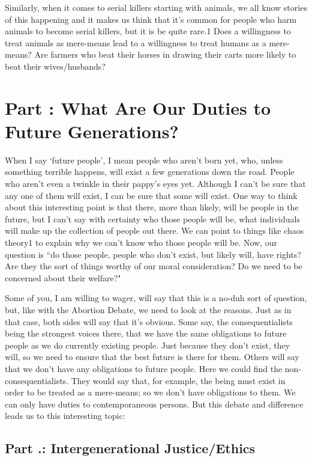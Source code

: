 Similarly, when it comes to serial killers starting with animals, we all know stories of this happening and it makes us think that it's common for people who harm animals to become serial killers, but it is be quite rare.1 Does a willingness to treat animals as mere-means lead to a willingness to treat humans as a mere-means? Are farmers who beat their horses in drawing their carts more likely to beat their wives/husbands?
\chapter{Part \thechapcount: What Are Our Duties to Future Generations?}\setcounter{seccount}{1}
When I say ‘future people’, I mean people who aren’t born yet, who, unless something terrible happens, will exist a few generations down the road. People who aren’t even a twinkle in their pappy’s eyes yet. Although I can’t be sure that any one of them will exist, I can be sure that some will exist. One way to think about this interesting point is that there, more than  likely, will be people in the future, but I can't say with certainty who those people will be, what individuals will make up the collection of people out there. We can point to things like chaos theory1 to explain why we can't know who those people will be.  Now, our question is ``do those people, people who don't exist, but likely will, have rights? Are they the sort of things worthy of our moral consideration? Do we need to be concerned about their welfare?"

Some of you, I am willing to wager, will say that this is a no-duh sort of question, but, like with the Abortion Debate, we need to look at the reasons. Just as in that case, both sides will say that it's obvious. Some say, the consequentialists being the strongest voices there, that we have the same obligations to future people as we do currently existing people. Just because they don't exist, they will, so we need to ensure that the best future is there for them. Others will say that we don't have any obligations to future people. Here we could find the non-consequentialists. They would say that, for example, the being must exist in order to be treated as a mere-means; so we don't have obligations to them. We can only have duties to contemporaneous persons. But this debate and difference leads us to this interesting topic:
\section{Part \thechapcount.\theseccount: Intergenerational Justice/Ethics}

